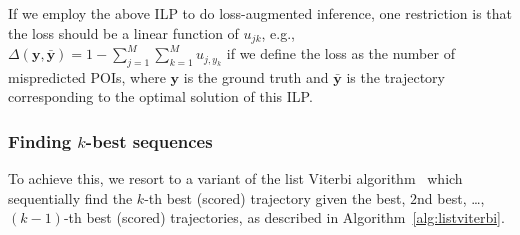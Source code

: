 If we employ the above ILP to do loss-augmented inference, one restriction is that the loss should be a linear function of $u_{jk}$,
e.g., $\Delta(\mathbf{y}, \bar{\mathbf{y}}) = 1 - \sum_{j=1}^M \sum_{k=1}^M u_{j, y_k}$ if we define the loss as the number of mispredicted POIs,
where $\mathbf{y}$ is the ground truth and $\bar{\mathbf{y}}$ is the trajectory corresponding to the optimal solution of this ILP.

\subsubsection{Finding $k$-best sequences}
To achieve this, we resort to a variant of the list Viterbi algorithm~\cite{nilsson2001sequentially,seshadri1994list}
which sequentially find the $k$-th best (scored) trajectory given the best, $2$nd best, \dots, $(k-1)$-th best (scored) trajectories,
as described in Algorithm~\ref{alg:listviterbi}.

